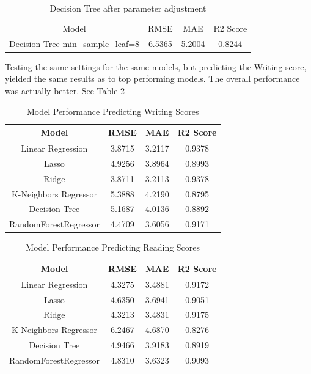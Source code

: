 \documentclass[doc]{apa6} %
\begin{document}
\begin{table}[H]
    \centering
    \begin{tabular}{|c|c|c|c|}
    \hline
        Model & RMSE & MAE & R2 Score\\
        Decision Tree min\_sample\_leaf=8 & 6.5365 & 5.2004 & 0.8244\\
        \hline
    \end{tabular}
    \caption{Decision Tree after parameter adjustment}
    \label{tab:DecTreeControlled}
\end{table}
Testing the same settings for the same models, but predicting the Writing score, yielded the same results as to top performing models. The overall performance was actually better. See Table \ref{tab:InitModelPerfWrite}
\begin{table}[H]
    \centering
    \begin{tabular}{|c|c|c|c|}
    \hline
         Model & RMSE & MAE & R2 Score\\
         \hline\hline
         Linear Regression & 3.8715 & 3.2117 & 0.9378\\
         \hline
         Lasso & 4.9256 & 3.8964 & 0.8993\\
         \hline
         Ridge & 3.8711 & 3.2113 & 0.9378\\
         \hline
         K-Neighbors Regressor & 5.3888 & 4.2190 & 0.8795\\
         \hline
         Decision Tree & 5.1687 & 4.0136 & 0.8892\\
         \hline
         RandomForestRegressor & 4.4709 & 3.6056 & 0.9171\\
         \hline
    \end{tabular}
    \caption{Model Performance Predicting Writing Scores}
    \label{tab:InitModelPerfWrite}
\end{table}
\begin{table}[H]
    \centering
    \begin{tabular}{|c|c|c|c|}
    \hline
         Model & RMSE & MAE & R2 Score\\
         \hline\hline
         Linear Regression & 4.3275 & 3.4881 & 0.9172\\
         \hline
         Lasso & 4.6350 & 3.6941 & 0.9051\\
         \hline
         Ridge & 4.3213 & 3.4831 & 0.9175\\
         \hline
         K-Neighbors Regressor & 6.2467 & 4.6870 & 0.8276\\
         \hline
         Decision Tree & 4.9466 & 3.9183 & 0.8919\\
         \hline
         RandomForestRegressor & 4.8310 & 3.6323 & 0.9093\\
         \hline
    \end{tabular}
    \caption{Model Performance Predicting Reading Scores}
    \label{tab:InitModelPerfRead}
\end{table}
\end{document}
